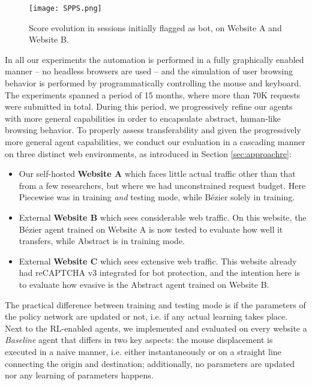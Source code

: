 \begin{figure*}[ht!]
\centerline{\texttt{[image: SPPS.png]}}
\caption{Score evolution in sessions initially flagged as bot, on Website A and Website B.}
\label{spps}
\end{figure*}

In all our experiments the automation is performed in a fully graphically enabled manner -- no headless browsers are used -- and the simulation of user browsing behavior is performed by programmatically controlling the mouse and keyboard.
The experiments spanned a period of 15 months, where more than 70K requests were submitted in total.
During this period, we progressively refine our agents with more general capabilities in order to encapsulate abstract, human-like browsing behavior.
To properly assess transferability and given the progressively more general agent capabilities, we conduct our evaluation in a cascading manner on three distinct web environments, as introduced in Section \ref{sec:approachre}:

\begin{itemize}
    \item Our self-hosted \textbf{Website A} which faces little actual traffic other than that from a few researchers, but where we had unconstrained request budget.
    Here Piecewise was in training \textit{and} testing mode, while Bézier solely in training.
    \item External \textbf{Website B} which sees considerable web traffic.
    On this website, the Bézier agent trained on Website A is now tested to evaluate how well it transfers, while Abstract is in training mode.
    \item External \textbf{Website C} which sees extensive web traffic.
    This website already had reCAPTCHA v3 integrated for bot protection, and the intention here is to evaluate how evasive is the Abstract agent trained on Website B.
\end{itemize}

The practical difference between training and testing mode is if the parameters of the policy network are updated or not, i.e. if any actual learning takes place.
Next to the RL-enabled agents, we implemented and evaluated on every website a \textit{Baseline} agent that differs in two key aspects: the mouse displacement is executed in a naive manner, i.e. either instantaneously or on a straight line connecting the origin and destination; additionally, no parameters are updated nor any learning of parameters happens.

